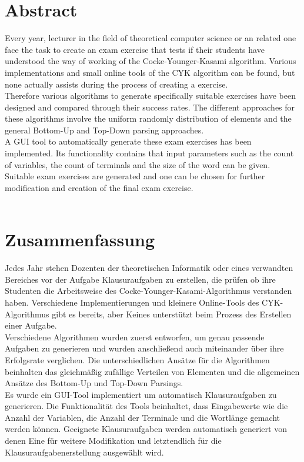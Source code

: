 \section*{Abstract}\label{abtract}
Every year, lecturer in the field of theoretical computer science or an related one face the task to create an exam exercise that tests if their students have understood the way of working of the Cocke-Younger-Kasami algorithm. Various implementations and small online tools of the CYK algorithm can be found, but none actually assists during the process of creating a exercise.\\
Therefore various algorithms to generate specifically suitable exercises have been designed and compared through their success rates. The different approaches for these algorithms involve the uniform randomly distribution of elements and the general Bottom-Up and Top-Down parsing approaches.\\
A GUI tool to automatically generate these exam exercises has been implemented. Its functionality contains that input parameters such as the count of variables, the count of terminals and the size of the word can be given. Suitable exam exercises are generated and one can be chosen for further modification and creation of the final exam exercise.\\


~~

\section*{Zusammenfassung}\label{zusammenfassung}
Jedes Jahr stehen Dozenten der theoretischen Informatik oder eines verwandten Bereiches vor der Aufgabe Klausuraufgaben zu erstellen, die prüfen ob ihre Studenten die Arbeitsweise des Cocke-Younger-Kasami-Algorithmus verstanden haben. Verschiedene Implementierungen und kleinere Online-Tools des CYK-Algorithmus gibt es bereits, aber Keines unterstützt beim Prozess des Erstellen einer Aufgabe.\\
Verschiedene Algorithmen wurden zuerst entworfen, um genau passende Aufgaben zu generieren und wurden anschließend auch miteinander über ihre Erfolgsrate verglichen. Die unterschiedlichen Ansätze für die Algorithmen beinhalten das gleichmäßig zufällige Verteilen von Elementen und die allgemeinen Ansätze des Bottom-Up und Top-Down Parsings.\\
Es wurde ein GUI-Tool implementiert um automatisch Klausuraufgaben zu generieren. Die Funktionalität des Tools beinhaltet, dass Eingabewerte wie die Anzahl der Variablen, die Anzahl der Terminale und die Wortlänge gemacht werden können. Geeignete Klausuraufgaben werden automatisch generiert von denen Eine für weitere Modifikation und letztendlich für die Klausuraufgabenerstellung ausgewählt wird.\\



\pagebreak

